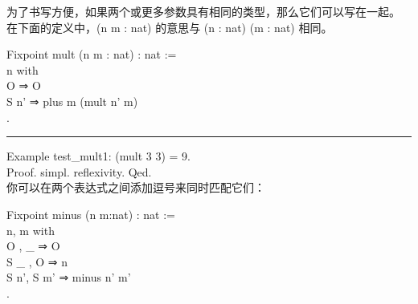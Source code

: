 \documentclass[utf8]{ctexart}
\begin{document}
为了书写方便，如果两个或更多参数具有相同的类型，那么它们可以写在一起。
在下面的定义中，{({n}} {{m}} {:} {{nat})} 的意思与 {({n}} {:} {{nat})}
{({m}} {:} {{nat})} 相同。

{Fixpoint} {mult} ({n} {m} : {nat}) : {nat} :=\\
\hspace*{0.333em}\hspace*{0.333em}{match} {n} {with}\\
\hspace*{0.333em}\hspace*{0.333em}\hspace*{0.333em}\hspace*{0.333em}\textbar{}
{O} ⇒ {O}\\
\hspace*{0.333em}\hspace*{0.333em}\hspace*{0.333em}\hspace*{0.333em}\textbar{}
{S} {n'} ⇒ {plus} {m} ({mult} {n'} {m})\\
\hspace*{0.333em}\hspace*{0.333em}{end}.\\

\begin{center}\rule{0.5\linewidth}{\linethickness}\end{center}

{Example} {test\_mult1}: ({mult} 3 3) = 9.\\
{Proof}. {simpl}. {reflexivity}. {Qed}.\\

你可以在两个表达式之间添加逗号来同时匹配它们：

{Fixpoint} {minus} ({n} {m}:{nat}) : {nat} :=\\
\hspace*{0.333em}\hspace*{0.333em}{match} {n}, {m} {with}\\
\hspace*{0.333em}\hspace*{0.333em}\textbar{} {O} , {\_} ⇒ {O}\\
\hspace*{0.333em}\hspace*{0.333em}\textbar{} {S} {\_} , {O} ⇒ {n}\\
\hspace*{0.333em}\hspace*{0.333em}\textbar{} {S} {n'}, {S} {m'} ⇒
{minus} {n'} {m'}\\
\hspace*{0.333em}\hspace*{0.333em}{end}.\\
\end{document}
